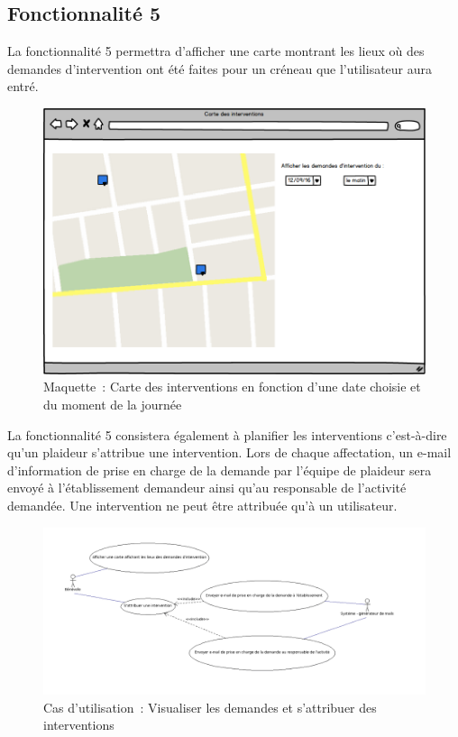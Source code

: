 \subsection{Fonctionnalité 5}
La fonctionnalité 5 permettra d'afficher une carte montrant les lieux où des demandes d'intervention ont été faites pour un créneau que l'utilisateur aura entré.

\begin{figure}[H]
	\centering
	\includegraphics[scale=0.575]{images/maquettes/fonctionnalite5CarteDesInterventions.png}
	\caption{Maquette~: Carte des interventions en fonction d'une date choisie et du moment de la journée}
\end{figure}

La fonctionnalité 5 consistera également à planifier les interventions c'est-à-dire qu'un plaideur s'attribue une intervention.
Lors de chaque affectation, un e-mail d'information de prise en charge de la demande par l'équipe de plaideur sera envoyé à l'établissement demandeur ainsi qu'au responsable de l'activité demandée.
Une intervention ne peut être attribuée qu'à un utilisateur.
\\

\begin{figure}[H]
	\centering
	\includegraphics[scale=0.4]{images/casDUtilisation/fonctionnalite5Attribution.png}
	 \caption{Cas d'utilisation~: Visualiser les demandes et s'attribuer des interventions}
	 \label{visualiserESAttribuer}
\end{figure}

